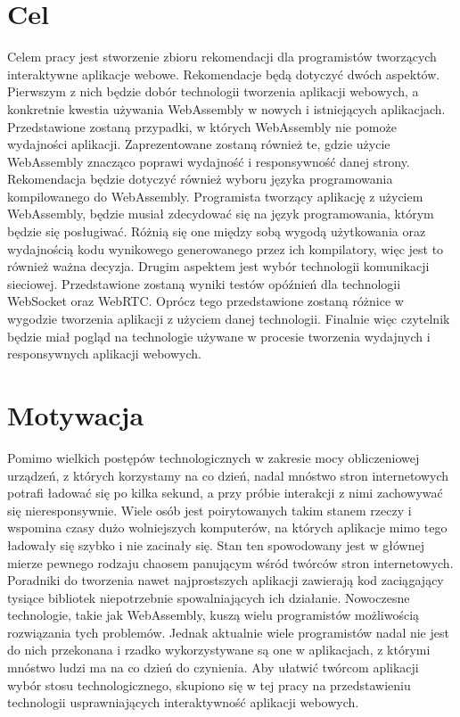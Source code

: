 \documentclass[language=polish,type=master]{aghmodern}
\begin{document}
\pagebreak

\section{Cel}
Celem pracy jest stworzenie zbioru rekomendacji dla programistów tworzących interaktywne aplikacje webowe.
Rekomendacje będą dotyczyć dwóch aspektów.
Pierwszym z nich będzie dobór technologii tworzenia aplikacji webowych, a konkretnie kwestia używania WebAssembly w nowych i istniejących aplikacjach.
Przedstawione zostaną przypadki, w których WebAssembly nie pomoże wydajności aplikacji.
Zaprezentowane zostaną również te, gdzie użycie WebAssembly znacząco poprawi wydajność i responsywność danej strony.
Rekomendacja będzie dotyczyć również wyboru języka programowania kompilowanego do WebAssembly.
Programista tworzący aplikację z użyciem WebAssembly, będzie musiał zdecydować się na język programowania, którym będzie się posługiwać.
Różnią się one między sobą wygodą użytkowania oraz wydajnością kodu wynikowego generowanego przez ich kompilatory, więc jest to również ważna decyzja.
Drugim aspektem jest wybór technologii komunikacji sieciowej.
Przedstawione zostaną wyniki testów opóźnień dla technologii WebSocket oraz WebRTC.
Oprócz tego przedstawione zostaną różnice w wygodzie tworzenia aplikacji z użyciem danej technologii.
Finalnie więc czytelnik będzie miał pogląd na technologie używane w procesie tworzenia wydajnych i responsywnych aplikacji webowych.

\section{Motywacja}
Pomimo wielkich postępów technologicznych w zakresie mocy obliczeniowej urządzeń, z których korzystamy na co dzień, nadal mnóstwo stron internetowych potrafi ładować się po kilka sekund, a przy próbie interakcji z nimi zachowywać się nieresponsywnie.
Wiele osób jest poirytowanych takim stanem rzeczy i wspomina czasy dużo wolniejszych komputerów, na których aplikacje mimo tego ładowały się szybko i nie zacinały się.
Stan ten spowodowany jest w głównej mierze pewnego rodzaju chaosem panującym wśród twórców stron internetowych.
Poradniki do tworzenia nawet najprostszych aplikacji zawierają kod zaciągający tysiące bibliotek niepotrzebnie spowalniających ich działanie.
Nowoczesne technologie, takie jak WebAssembly, kuszą wielu programistów możliwością rozwiązania tych problemów.
Jednak aktualnie wiele programistów nadal nie jest do nich przekonana i rzadko wykorzystywane są one w aplikacjach, z którymi mnóstwo ludzi ma na co dzień do czynienia.
Aby ułatwić twórcom aplikacji wybór stosu technologicznego, skupiono się w tej pracy na przedstawieniu technologii usprawniających interaktywność aplikacji webowych.
\end{document}
